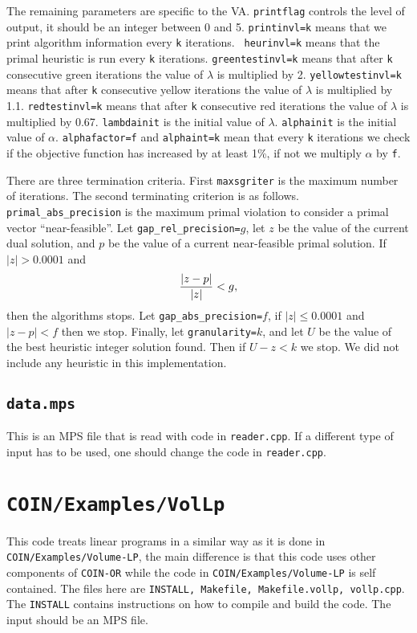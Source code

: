 \documentclass{article}
\begin{document}
The remaining parameters are specific to the VA. {\tt printflag} controls the
level of output, it should be an integer between 0 and 5. {\tt printinvl=k}
means that we print algorithm information every {\tt k} iterations. {\tt
heurinvl=k} means that the primal heuristic is run every {\tt k} iterations.
{\tt greentestinvl=k} means that after {\tt k} consecutive green iterations
the value of $\lambda$ is multiplied by 2. {\tt yellowtestinvl=k} means that
after {\tt k} consecutive yellow iterations the value of $\lambda$ is
multiplied by 1.1. {\tt redtestinvl=k} means that after {\tt k} consecutive
red iterations the value of $\lambda$ is multiplied by 0.67. {\tt lambdainit}
is the initial value of $\lambda$. {\tt alphainit} is the initial value of
$\alpha$. {\tt alphafactor=f} and {\tt alphaint=k} mean that every {\tt k}
iterations we check if the objective function has increased by at least 1\%,
if not we multiply $\alpha$ by {\tt f}.

There are three termination criteria. First {\tt maxsgriter} is the maximum
number of iterations. The second terminating criterion is as follows. {\tt
primal\_abs\_precision} is the maximum primal violation to consider a primal
vector ``near-feasible''. Let {\tt gap\_rel\_precision=$g$}, let $z$ be the
value of the current dual solution, and $p$ be the value of a current
near-feasible primal solution. If $|z| > 0.0001$ and
$$
        { | z - p | \over | z | } < g,
$$
then the algorithms stops. Let {\tt gap\_abs\_precision=$f$}, if $|z| \le
0.0001$ and $| z - p | < f$ then we stop. Finally, let {\tt granularity=$k$},
and let $U$ be the value of the best heuristic integer solution found. Then if
$ U - z < k$ we stop. We did not include any heuristic in this 
implementation.

\subsection{{\tt data.mps}}

This is an MPS file that is read with code in {\tt reader.cpp}.
If a different type of input has to be used, one should change
the code in {\tt reader.cpp}.

\section{{\tt COIN/Examples/VolLp}}

This code treats linear programs in a similar way as it is done in 
{\tt COIN/Examples/Volume-LP}, the main difference is that this
code uses other components of {\tt COIN-OR} while the code in \goodbreak
{\tt COIN/Examples/Volume-LP} is self contained. 
The files here are {\tt INSTALL, Makefile, \goodbreak
Makefile.vollp, vollp.cpp}.
The {\tt INSTALL} contains instructions on how to compile and build
the code. The input should be an MPS file.
\end{document}

